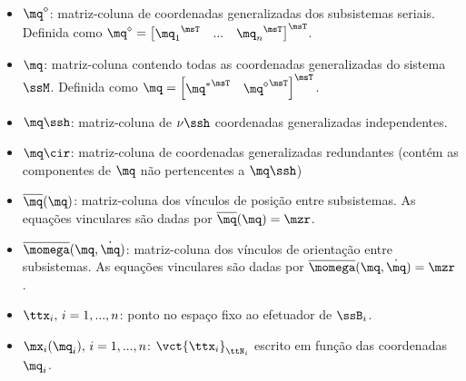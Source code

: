 \documentclass[]{politex}
\begin{document}
\begin{itemize}
\item $\mq^\diamond$: matriz-coluna de coordenadas generalizadas dos subsistemas seriais. Definida como $\mq^\diamond = \begin{bmatrix}  {\mq_1}^\msT & ... & {\mq_{n}}^\msT \end{bmatrix}^\msT $.
\item $\mq$: matriz-coluna contendo todas as coordenadas generalizadas do sistema $\ssM$. Definida como $\mq = \begin{bmatrix} {\mq^\ast}^\msT & {\mq^\diamond}^\msT \end{bmatrix}^\msT $.
\item $\mq\ssh$: matriz-coluna de $\nu\ssh$ coordenadas generalizadas independentes.
\item $\mq\cir$: matriz-coluna de coordenadas generalizadas redundantes (contém as componentes de $\mq$ não pertencentes a $\mq\ssh$)
\item $\overline{\mq}(\mq)$: matriz-coluna dos v\'inculos de posi\c{c}\~ao entre subsistemas. As equa\c{c}\~oes vinculares s\~ao dadas por $\overline{\mq}(\mq) = \mzr $.
\item $\overline{\momega}(\mq,\dot{\mq})$: matriz-coluna dos v\'inculos de orienta\c{c}\~ao entre subsistemas. As equa\c{c}\~oes vinculares s\~ao dadas por $\overline{\momega}(\mq,\dot{\mq}) = \mzr $.
\item $\ttx_i, \,i=1, ..., n$: ponto no espa\c{c}o fixo ao efetuador de $\ssB_i$.
\item $\mx_i(\mq_i), \,i=1, ..., n$: $\vct{\ttx_i}_{\ttN_i}$ escrito em função das coordenadas $\mq_i$.

\end{itemize}
\end{document}
